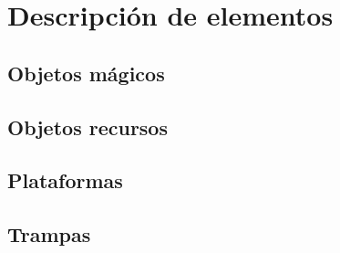\section{Descripción de elementos} %


\subsection{Objetos mágicos}

\subsection{Objetos recursos}

\subsection{Plataformas}

\subsection{Trampas}
